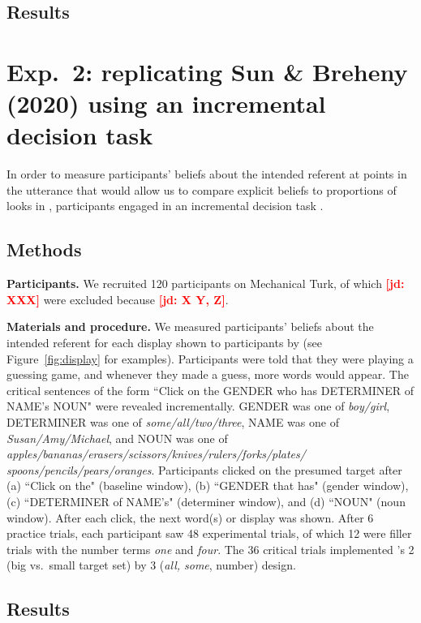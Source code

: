 \documentclass[10pt,letterpaper]{article}
\newcommand{\figref}[1]{Figure~\ref{#1}}
\newcommand{\jd}[1]{\textcolor{Red}{\textbf{[jd: #1]}}}
\begin{document}
\subsection{Results}

\section{Exp.~2: replicating Sun \& Breheny (2020) using an incremental decision task}

In order to measure participants' beliefs about the intended referent at points in the utterance that would allow us to compare explicit beliefs to proportions of looks in , participants engaged in an incremental decision task \cite{Allopenna1998,QingLD2018, KreissDegen2020}. 

\subsection{Methods}

\textbf{Participants.} We recruited 120 participants on Mechanical Turk, of which \jd{XXX} were excluded because \jd{X Y, Z}. 

\textbf{Materials and procedure.} We measured participants' beliefs about the intended referent for each display shown to participants by  (see \figref{fig:display} for examples). Participants were told that they were playing a guessing game, and whenever they made a guess, more words would appear. The critical sentences of the form ``Click on the GENDER who has DETERMINER  of NAME's NOUN" were revealed incrementally. GENDER was one of \emph{boy/girl}, DETERMINER was one of \emph{some/all/two/three}, NAME was one of \emph{Susan/Amy/Michael}, and NOUN was one of \emph{apples/bananas/erasers/scissors/knives/rulers/forks/plates/
spoons/pencils/pears/oranges}.  Participants clicked on the presumed target after (a) ``Click on the" (baseline window), (b) ``GENDER that has" (gender window), (c) ``DETERMINER of NAME's" (determiner window), and (d) ``NOUN" (noun window). After each click, the next word(s) or display was shown. After 6 practice trials, each participant saw 48 experimental trials, of which 12 were filler trials with the number terms \emph{one} and \emph{four}. The 36 critical trials implemented 's 2 (big vs.~small target set) by 3 (\emph{all, some}, number) design. 


\subsection{Results}
\end{document}
